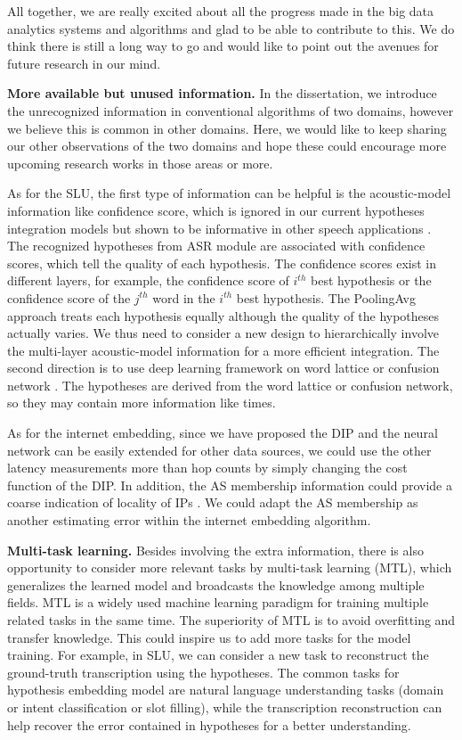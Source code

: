 \documentclass [PhD] {uclathes}
\begin{document}
All together, we are really excited about all the progress made in the big data analytics systems and algorithms  and glad to be able to contribute to this. We do think there is still a long way to go and would like to point out the avenues for future research in our mind.

\textbf{More available but unused information.}  In the dissertation, we introduce the unrecognized information in conventional algorithms of two domains, however we believe this is common in other domains. Here, we would like to keep sharing our other observations of  the two domains  and hope these could encourage more upcoming research works in those areas or more. 
 
As for the SLU, the first type of information can be helpful is the acoustic-model information like confidence score, which is ignored in our current hypotheses integration models but shown to be informative in other speech applications \citep{kumar2014normalization, fiscus1997post}. The recognized hypotheses from ASR module are associated with confidence scores, which tell the quality of each hypothesis. The confidence scores exist in different  layers, for example, the  confidence score of $i^{th}$ best hypothesis or the  confidence score of the $j^{th}$ word in the $i^{th}$ best hypothesis. The PoolingAvg approach treats each hypothesis equally although the quality of the hypotheses actually varies. We thus need to consider a new design to hierarchically involve the multi-layer acoustic-model information for a more efficient integration. The second direction is to use deep learning framework on word lattice \citep{liu2014efficient} or confusion network \citep{hakkani2006beyond, tur2002improving}. The hypotheses are derived from the word lattice or confusion network, so they may contain more information like times.  

As for the internet embedding, since we have proposed the DIP and the neural network can be easily extended for other data sources, we could use the other latency measurements \citep{vivaldi} more than hop counts by simply changing the cost function of the DIP.  In addition, the AS membership information could provide a coarse indication of locality of IPs \citep{barford-infocom}. We could adapt the AS membership as another estimating error within the internet embedding algorithm.

\textbf{Multi-task learning.}  Besides involving the extra information, there is also opportunity to consider more relevant tasks by multi-task learning (MTL),  which generalizes the learned model and broadcasts the knowledge among multiple fields. MTL \citep{zhang2017survey,liu2019multi,caruana1997multitask} is a widely used machine learning paradigm for training multiple related tasks in the same time. The superiority of MTL is to avoid  overfitting and transfer knowledge. This could inspire us to add more tasks for the model training. For example, in  SLU,  we can consider a new task to reconstruct the ground-truth transcription using the hypotheses.  The common tasks for hypothesis embedding model are natural language understanding tasks (domain or intent classification or slot filling), while the transcription reconstruction can help recover the error contained in hypotheses for a better understanding.
\end{document}
